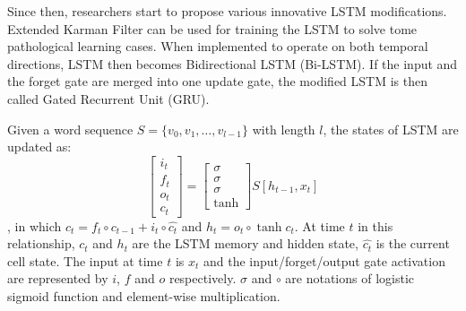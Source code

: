 \documentclass[conference]{IEEEtran}
\begin{document}
    Since then, researchers start to propose various innovative LSTM modifications.
    Extended Karman Filter can be used for training the LSTM to solve tome pathological
    learning cases\cite{perez2003kalman}. When implemented to operate on both temporal
    directions, LSTM then becomes Bidirectional LSTM 
    (Bi-LSTM)\cite{schuster1997bidirectional,barnes2017assessing}.
    If the input and the forget gate are merged into one update gate, the modified LSTM
    is then called Gated Recurrent Unit (GRU)\cite{cho2014learning}.
    
    Given a word sequence $S=\{v_0,v_1,\ldots,v_{l-1}\}$ with length $l$, the states
    of LSTM are updated as:
    $$
    \begin{bmatrix} 
    i_t\\f_t\\o_t\\c_t 
    \end{bmatrix} = 
    \begin{bmatrix}
    \sigma\\\sigma\\\sigma\\\tanh
    \end{bmatrix}
    S[h_{t-1},x_t]
    $$
    , in which $c_t=f_t\circ c_{t-1} + i_t\circ\hat{c_t}$ and $h_t=o_t\circ\tanh{c_t}$.
    At time $t$ in this relationship, $c_t$ and $h_t$ are the LSTM memory and 
    hidden state, $\hat{c_t}$ is the current cell state. The input at time $t$ 
    is $x_t$ and the input/forget/output gate activation are represented by $i$, 
    $f$ and $o$ respectively. $\sigma$ and $\circ$ are notations of logistic 
    sigmoid function and element-wise multiplication\cite{zhou2016text}.
    
    
\end{document}
